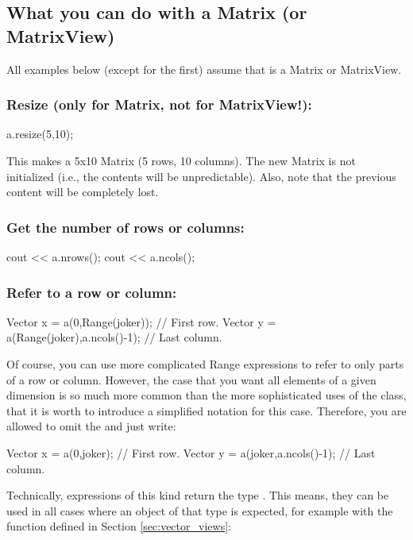 \subsection{What you can do with a Matrix (or MatrixView)}

All examples below (except for the first) assume that  is a
Matrix or MatrixView.

\subsubsection{Resize (only for Matrix, not for MatrixView!):}
\begin{code}
a.resize(5,10);
\end{code}
This makes  a 5x10 Matrix (5 rows, 10 columns). The new Matrix
is not initialized (i.e., the contents will be unpredictable). Also,
note that the previous content will be completely lost.

\subsubsection{Get the number of rows or columns:}
\begin{code}
cout << a.nrows();
cout << a.ncols();
\end{code}

\subsubsection{Refer to a row or column:}
\begin{code}
Vector x = a(0,Range(joker));           // First row.
Vector y = a(Range(joker),a.ncols()-1); // Last column.
\end{code}
Of course, you can use more complicated Range expressions to refer to
only parts of a row or column. However, the case that you want all
elements of a given dimension is so
much more common than the more sophisticated uses of the
 class, that it is worth to introduce a simplified
notation for this case. Therefore, you are allowed to
omit the  and just write:
\begin{code}
Vector x = a(0,joker);           // First row.
Vector y = a(joker,a.ncols()-1); // Last column.
\end{code}

Technically, expressions of this kind return the type
. This means, they can be used in all cases
where an object of that type is expected, for example with the
function defined in Section \ref{sec:vector_views}:

